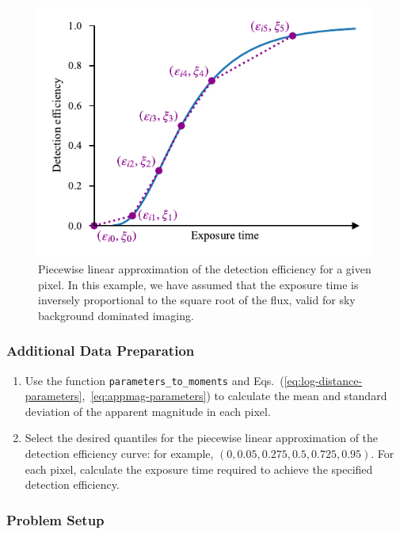 \documentclass[twocolumn,times]{aastex631}
\begin{document}
\begin{figure}
    \includegraphics[width=\columnwidth]{figures/piecewise-linear-exptime}
    \caption{\label{fig:piecewise-linear-exptime}Piecewise linear approximation of the detection efficiency for a given pixel. In this example, we have assumed that the exposure time is inversely proportional to the square root of the flux, valid for sky background dominated imaging.}
\end{figure}

\subsubsection{Additional Data Preparation}

\begin{enumerate}
    \item Use the function \texttt{parameters\_to\_moments} and Eqs.~(\ref{eq:log-distance-parameters},~\ref{eq:appmag-parameters}) to calculate the mean and standard deviation of the apparent magnitude in each pixel.
    \item Select the desired quantiles for the piecewise linear approximation of the detection efficiency curve: for example, $(0, 0.05 , 0.275, 0.5  , 0.725, 0.95)$. For each pixel, calculate the exposure time required to achieve the specified detection efficiency.
\end{enumerate}

\subsubsection{Problem Setup}
\end{document}
